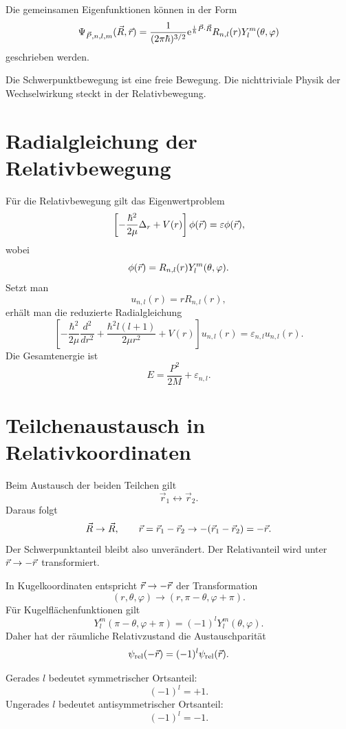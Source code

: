 Die gemeinsamen Eigenfunktionen können in der Form
\[
    \Psi_{\vec P,n,l,m}(\vec R,\vec r)
    =\frac{1}{(2\pi\hbar)^{3/2}}
    \mathrm{e}^{\frac{\mathrm{i}}{\hbar}\vec P\cdot\vec R}
    R_{n,l}(r)Y_l^m(\theta,\varphi)
\]
geschrieben werden.

\begin{conceptbox}
Die Schwerpunktbewegung ist eine freie Bewegung. Die nichttriviale Physik der Wechselwirkung steckt in der Relativbewegung.
\end{conceptbox}

\section{Radialgleichung der Relativbewegung}

Für die Relativbewegung gilt das Eigenwertproblem
\[
    \left[-\frac{\hbar^2}{2\mu}\Delta_r+V(r)\right]
    \phi(\vec r)=\varepsilon\phi(\vec r),
\]
wobei
\[
    \phi(\vec r)=R_{n,l}(r)Y_l^m(\theta,\varphi).
\]
Setzt man
\[
    u_{n,l}(r)=rR_{n,l}(r),
\]
erhält man die reduzierte Radialgleichung
\[
    \left[-\frac{\hbar^2}{2\mu}\frac{d^2}{dr^2}
    +\frac{\hbar^2 l(l+1)}{2\mu r^2}+V(r)\right]u_{n,l}(r)
    =\varepsilon_{n,l}u_{n,l}(r).
\]
Die Gesamtenergie ist
\[
    E=\frac{P^2}{2M}+\varepsilon_{n,l}.
\]

\section{Teilchenaustausch in Relativkoordinaten}

Beim Austausch der beiden Teilchen gilt
\[
    \vec r_1\leftrightarrow\vec r_2.
\]
Daraus folgt
\[
    \vec R\to\vec R,
    \qquad
    \vec r=\vec r_1-\vec r_2\to -(\vec r_1-\vec r_2)=-\vec r.
\]
Der Schwerpunktanteil bleibt also unverändert. Der Relativanteil wird unter \(\vec r\to-\vec r\) transformiert.

In Kugelkoordinaten entspricht \(\vec r\to-\vec r\) der Transformation
\[
    (r,\theta,\varphi)\to(r,\pi-\theta,\varphi+\pi).
\]
Für Kugelflächenfunktionen gilt
\[
    Y_l^m(\pi-\theta,\varphi+\pi)=(-1)^lY_l^m(\theta,\varphi).
\]
Daher hat der räumliche Relativzustand die Austauschparität
\[
    \psi_{\text{rel}}(-\vec r)=(-1)^l\psi_{\text{rel}}(\vec r).
\]

\begin{formulabox}
Gerades \(l\) bedeutet symmetrischer Ortsanteil:
\[
    (-1)^l=+1.
\]
Ungerades \(l\) bedeutet antisymmetrischer Ortsanteil:
\[
    (-1)^l=-1.
\]
\end{formulabox}

